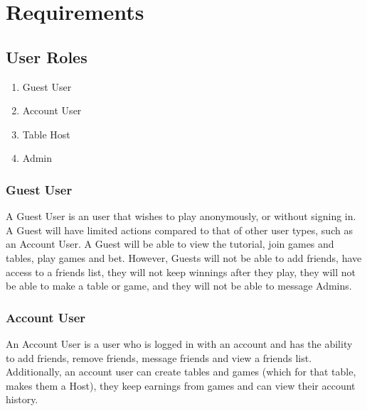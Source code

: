 \section{Requirements}




\subsection{User Roles}
\begin{enumerate}
    \item Guest User
    \item Account User
    \item Table Host
    \item Admin
\end{enumerate} 


\subsubsection{Guest User}
A Guest User is an user that wishes to play anonymously, or without signing in. A Guest will have limited actions compared to that of other user types, such as an Account User. A Guest will be able to view the tutorial, join games and tables, play games and bet. However, Guests will not be able to add friends, have access to a friends list, they will not keep winnings after they play, they will not be able to make a table or game, and they will not be able to message Admins.

\subsubsection{Account User}
An Account User is a user who is logged in with an account and has the ability to add friends, remove friends, message friends and view a friends list. Additionally, an account user can create tables and games (which for that table, makes them a Host), they keep earnings from games and can view their account history. 

